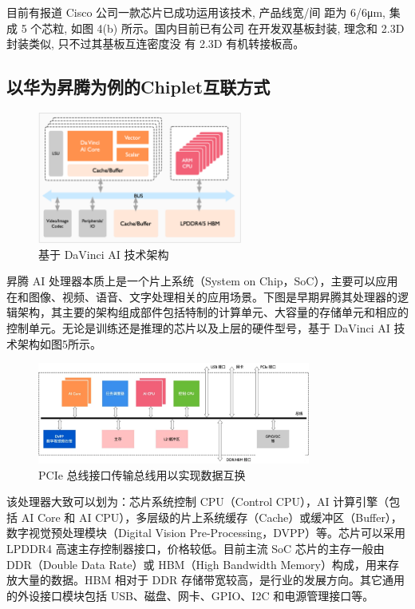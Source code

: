 目前有报道 Cisco 公司一款芯片已成功运用该技术, 产品线宽/间 距为 6/6μm, 集成 5 个芯粒, 如图 4(b) 
所示。国内目前已有公司 在开发双基板封装, 理念和 2.3D 封装类似, 只不过其基板互连密度没 有 2.3D 有机转接板高。

\subsection{以华为昇腾为例的Chiplet互联方式}

\begin{figure}[htbp]
	\centering
	\includegraphics[width=0.6\textwidth]{img/5.png} %
	\caption{基于 DaVinci AI 技术架构 \cite{CnblBlog2025}}
	\label{fig:example}
\end{figure}


昇腾 AI 处理器本质上是一个片上系统（System on Chip，SoC），主要可以应用在和图像、视频、语音、文字处理相关的应用场景。下图是早期昇腾其处理器的逻辑架构，其主要的架构组成部件包括特制的计算单元、大容量的存储单元和相应的控制单元。无论是训练还是推理的芯片以及上层的硬件型号，基于 DaVinci AI 技术架构如图5所示。

\begin{figure}[htbp]
	\centering
	\includegraphics[width=0.8\textwidth]{img/6.png} %
	\caption{ PCIe 总线接口传输总线用以实现数据互换 }
	\label{fig:example}
\end{figure}

该处理器大致可以划为：芯片系统控制 CPU（Control CPU），AI 计算引擎（包括 AI Core 和 AI CPU），多层级的片上系统缓存（Cache）或缓冲区（Buffer），数字视觉预处理模块（Digital Vision Pre-Processing，DVPP）等。芯片可以采用 LPDDR4 高速主存控制器接口，价格较低。目前主流 SoC 芯片的主存一般由 DDR（Double Data Rate）或 HBM（High Bandwidth Memory）构成，用来存放大量的数据。HBM 相对于 DDR 存储带宽较高，是行业的发展方向。其它通用的外设接口模块包括 USB、磁盘、网卡、GPIO、I2C 和电源管理接口等。

